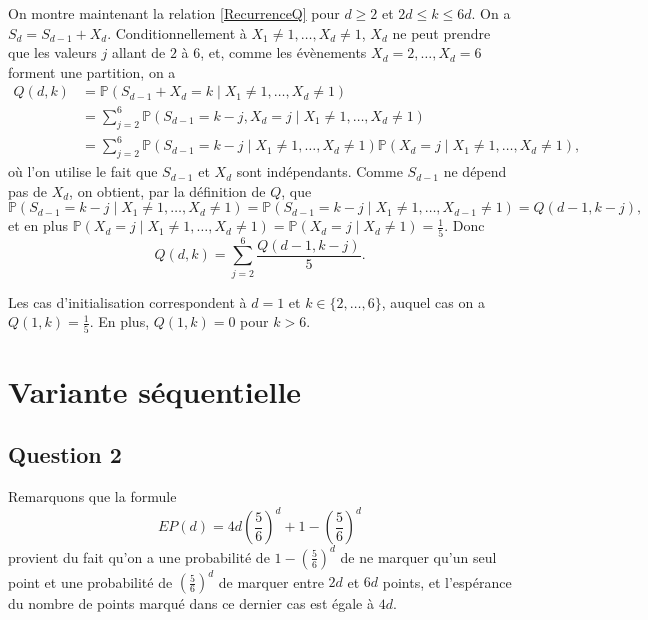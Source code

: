 \documentclass[a4paper,11pt]{amsart}
\theoremstyle{plain}
\begin{document}
On montre maintenant la relation \eqref{RecurrenceQ} pour $d \geq 2$ et $2d \leq k \leq 6d$. On a $S_d = S_{d-1} + X_d$. Conditionnellement à $X_1 \neq 1, \dotsc, X_d \neq 1$, $X_d$ ne peut prendre que les valeurs $j$ allant de $2$ à $6$, et, comme les évènements $X_d = 2, \dotsc, X_d = 6$ forment une partition, on a
\begin{align*}
Q(d, k) & = \mathbb P(S_{d-1} + X_d = k \mid X_1 \neq 1, \dotsc, X_d \neq 1) \\
& = \sum_{j=2}^6 \mathbb P(S_{d-1} = k-j, X_d = j \mid X_1 \neq 1, \dotsc, X_d \neq 1) \\
& = \sum_{j=2}^6 \mathbb P(S_{d-1} = k-j \mid X_1 \neq 1, \dotsc, X_d \neq 1)\mathbb P(X_d = j \mid X_1 \neq 1, \dotsc, X_d \neq 1),
\end{align*}
où l'on utilise le fait que $S_{d-1}$ et $X_d$ sont indépendants. Comme $S_{d-1}$ ne dépend pas de $X_d$, on obtient, par la définition de $Q$, que
\[\mathbb P(S_{d-1} = k-j \mid X_1 \neq 1, \dotsc, X_d \neq 1) = \mathbb P(S_{d-1} = k-j \mid X_1 \neq 1, \dotsc, X_{d-1} \neq 1) = Q(d-1, k-j),\]
et en plus $\mathbb P(X_d = j \mid X_1 \neq 1, \dotsc, X_d \neq 1) = \mathbb P(X_d = j \mid X_d \neq 1) = \frac{1}{5}$. Donc
\begin{equation*}
Q(d, k) = \sum_{j=2}^6 \frac{Q(d-1, k-j)}{5}.
\end{equation*}

Les cas d'initialisation correspondent à $d = 1$ et $k \in \{2, \dotsc, 6\}$, auquel cas on a $Q(1, k) = \frac{1}{5}$. En plus, $Q(1, k) = 0$ pour $k > 6$.

\section{Variante séquentielle}

\subsection{Question 2}

Remarquons que la formule 
\begin{equation}
\label{EPd}
EP(d) = 4 d \left(\frac{5}{6}\right)^d + 1 - \left(\frac{5}{6}\right)^d
\end{equation}
provient du fait qu'on a une probabilité de $1 - \left(\frac{5}{6}\right)^d$ de ne marquer qu'un seul point et une probabilité de $\left(\frac{5}{6}\right)^d$ de marquer entre $2d$ et $6d$ points, et l'espérance du nombre de points marqué dans ce dernier cas est égale à $4d$.
\end{document}
